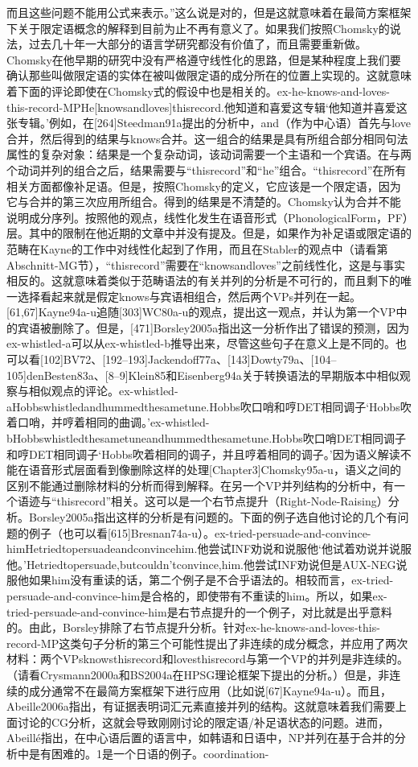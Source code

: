 而且这些问题不能用公式来表示。”这么说是对的，但是这就意味着在最简方案框架下关于限定语概念的解释到目前为止不再有意义了。如果我们按照Chomsky的说法，过去几十年一大部分的语言学研究都没有价值了，而且需要重新做。Chomsky在他早期的研究中没有严格遵守线性化的思路，但是某种程度上我们要确认那些叫做限定语的实体在被叫做限定语的成分所在的位置上实现的。这就意味着下面的评论即使在Chomsky式的假设中也是相关的。ex-he-knows-and-loves-this-record-MPHe[knowsandloves]thisrecord.他知道和喜爱这专辑`他知道并喜爱这张专辑。'例如，在[264]Steedman91a提出的分析中，and（作为中心语）首先与love合并，然后得到的结果与knows合并。这一组合的结果是具有所组合部分相同句法属性的复杂对象：结果是一个复杂动词，该动词需要一个主语和一个宾语。在与两个动词并列的组合之后，结果需要与“thisrecord”和“he”组合。“thisrecord”在所有相关方面都像补足语。但是，按照Chomsky的定义，它应该是一个限定语，因为它与合并的第三次应用所组合。得到的结果是不清楚的。Chomsky认为合并不能说明成分序列。按照他的观点，线性化发生在语音形式（PhonologicalForm，PF）层。其中的限制在他近期的文章中并没有提及。但是，如果作为补足语或限定语的范畴在Kayne的工作中对线性化起到了作用，而且在Stabler的观点中（请看第Abschnitt-MG节），“thisrecord”需要在“knowsandloves”之前线性化，这是与事实相反的。这就意味着类似于范畴语法的有关并列的分析是不可行的，而且剩下的唯一选择看起来就是假定knows与宾语相组合，然后两个VPs并列在一起。[61,67]Kayne94a-u追随[303]WC80a-u的观点，提出这一观点，并认为第一个VP中的宾语被删除了。但是，[471]Borsley2005a指出这一分析作出了错误的预测，因为ex-whistled-a可以从ex-whistled-b推导出来，尽管这些句子在意义上是不同的。也可以看[102]BV72、[192--193]Jackendoff77a、[143]Dowty79a、[104--105]denBesten83a、[8--9]Klein85和Eisenberg94a关于转换语法的早期版本中相似观察与相似观点的评论。ex-whistled-aHobbswhistledandhummedthesametune.Hobbs吹口哨和哼DET相同调子`Hobbs吹着口哨，并哼着相同的曲调。'ex-whistled-bHobbswhistledthesametuneandhummedthesametune.Hobbs吹口哨DET相同调子和哼DET相同调子`Hobbs吹着相同的调子，并且哼着相同的调子。'因为语义解读不能在语音形式层面看到像删除这样的处理[Chapter3]Chomsky95a-u，语义之间的区别不能通过删除材料的分析而得到解释。在另一个VP并列结构的分析中，有一个语迹与“thisrecord”相关。这可以是一个右节点提升（Right-Node-Raising）分析。Borsley2005a指出这样的分析是有问题的。下面的例子选自他讨论的几个有问题的例子（也可以看[615]Bresnan74a-u）。ex-tried-persuade-and-convince-himHetriedtopersuadeandconvincehim.他尝试INF劝说和说服他`他试着劝说并说服他。'Hetriedtopersuade,butcouldn'tconvince,him.他尝试INF劝说但是AUX-NEG说服他如果him没有重读的话，第二个例子是不合乎语法的。相较而言，ex-tried-persuade-and-convince-him是合格的，即使带有不重读的him。所以，如果ex-tried-persuade-and-convince-him是右节点提升的一个例子，对比就是出乎意料的。由此，Borsley排除了右节点提升分析。针对ex-he-knows-and-loves-this-record-MP这类句子分析的第三个可能性提出了非连续的成分概念，并应用了两次材料：两个VPsknowsthisrecord和lovesthisrecord与第一个VP的并列是非连续的。（请看Crysmann2000a和BS2004a在HPSG理论框架下提出的分析。）但是，非连续的成分通常不在最简方案框架下进行应用（比如说[67]Kayne94a-u）。而且，Abeille2006a指出，有证据表明词汇元素直接并列的结构。这就意味着我们需要上面讨论的CG分析，这就会导致刚刚讨论的限定语/补足语状态的问题。进而，Abeillé指出，在中心语后置的语言中，如韩语和日语中，NP并列在基于合并的分析中是有困难的。1是一个日语的例子。coordination-